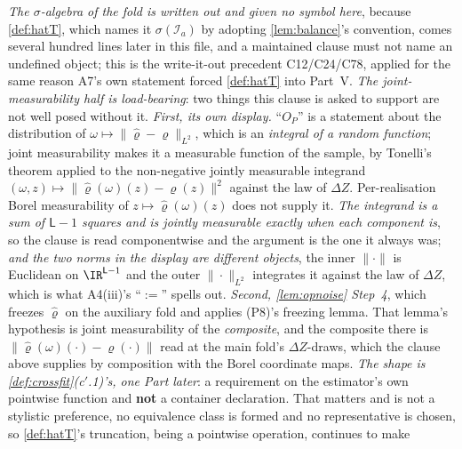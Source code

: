 \medskip
\noindent
\emph{The $\sigma$-algebra of the fold is written out and given no symbol here}, because
\cref{def:hatT}, which names it $\sigma(\mathcal I_a)$ by adopting \cref{lem:balance}'s convention, 
comes several hundred lines later in this file, and a maintained clause must not name an undefined object;
this is the write-it-out precedent C12/C24/C78, applied for the same reason A7's own statement forced
\cref{def:hatT} into Part~V.
\emph{The joint-measurability half is load-bearing}: two things this clause is asked to support are not
well posed without it.
\emph{First, its own display.} ``$O_P$'' is a statement about the distribution of
$\omega\mapsto\|\hat\varrho-\varrho\|_{L^2}$, which is an \emph{integral of a random function}; joint
measurability makes it a measurable function of the sample, by Tonelli's theorem applied to the
non-negative jointly measurable integrand $(\omega,z)\mapsto\|\hat\varrho(\omega)(z)-\varrho(z)\|^{2}$
against the law of $\Delta Z$. Per-realisation Borel measurability of $z\mapsto\hat\varrho(\omega)(z)$
does not supply it. \emph{The integrand is a sum of $\mathsf L-1$ squares and is jointly measurable
exactly when each component is}, so the clause is read componentwise and the argument is the one it
always was; \emph{and the two norms in the display are different objects}, the inner
$\|\cdot\|$ is Euclidean on $\IR^{\mathsf L-1}$ and the outer $\|\cdot\|_{L^2}$ integrates it against
the law of $\Delta Z$, which is what A4(iii)'s ``$:=$'' spells out.
\emph{Second, \cref{lem:opnoise} Step~4}, which freezes $\hat\varrho$ on the auxiliary fold and applies
\textup{(P8)}'s freezing lemma. That lemma's hypothesis is joint measurability of the \emph{composite},
and the composite there is $\|\hat\varrho(\omega)(\cdot)-\varrho(\cdot)\|$ read at the main fold's
$\Delta Z$-draws, which the clause above supplies by composition with the Borel coordinate maps.
\emph{The shape is \cref{def:crossfit}\textup{(c$'$.1)}'s, one Part later}: a requirement on the
estimator's own pointwise function and \textbf{not} a container declaration. That matters and is not a
stylistic preference, no equivalence class is formed and no representative is chosen, so
\cref{def:hatT}'s truncation, being a pointwise operation, continues to make
